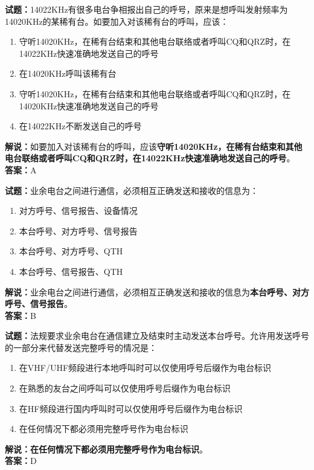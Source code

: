\documentclass{ctexbook}
\begin{document}
\bigskip


\noindent\textbf{试题：}14022KHz有很多电台争相报出自己的呼号，原来是想呼叫发射频率为14020KHz的某稀有台。如要加入对该稀有台的呼叫，应该：
\begin{enumerate}[leftmargin=3em]
\item 守听14020KHz，在稀有台结束和其他电台联络或者呼叫CQ和QRZ时，在14022KHz快速准确地发送自己的呼号
\item 在14020KHz呼叫该稀有台
\item 守听14020KHz，在稀有台结束和其他电台联络或者呼叫CQ和QRZ时，在14020KHz快速准确地发送自己的呼号
\item 在14022KHz不断发送自己的呼号
\end{enumerate}
\noindent\textbf{解说：}如要加入对该稀有台的呼叫，应该\textbf{守听14020KHz，在稀有台结束和其他电台联络或者呼叫CQ和QRZ时，在14022KHz快速准确地发送自己的呼号}。\\\noindent\textbf{答案：}A




\bigskip


\noindent\textbf{试题：}业余电台之间进行通信，必须相互正确发送和接收的信息为：
\begin{enumerate}[leftmargin=3em]
\item 对方呼号、信号报告、设备情况
\item 本台呼号、对方呼号、信号报告
\item 本台呼号、对方呼号、QTH
\item 本台呼号、信号报告、QTH
\end{enumerate}
\noindent\textbf{解说：}业余电台之间进行通信，必须相互正确发送和接收的信息为\textbf{本台呼号、对方呼号、信号报告}。\\\noindent\textbf{答案：}B




\bigskip


\noindent\textbf{试题：}法规要求业余电台在通信建立及结束时主动发送本台呼号。允许用发送呼号的一部分来代替发送完整呼号的情况是：
\begin{enumerate}[leftmargin=3em]
\item 在VHF/UHF频段进行本地呼叫时可以仅使用呼号后缀作为电台标识
\item 在熟悉的友台之间呼叫可以仅使用呼号后缀作为电台标识
\item 在HF频段进行国内呼叫时可以仅使用呼号后缀作为电台标识
\item 在任何情况下都必须用完整呼号作为电台标识
\end{enumerate}
\noindent\textbf{解说：}\textbf{在任何情况下都必须用完整呼号作为电台标识}。\\\noindent\textbf{答案：}D
\end{document}
